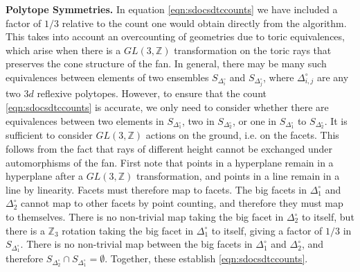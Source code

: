 \documentclass[aps,prl,twocolumn, superscriptaddress,groupedaddress,nofootinbib]{revtex4-1}
\newcommand{\bZ}{\mathbb{Z}}
\newcommand{\sdoc}{S_{\Delta_1^\circ}}
\newcommand{\sdtc}{S_{\Delta_2^\circ}}
\newcommand{\doc}{{\Delta_1^\circ}}
\newcommand{\dtc}{{\Delta_2^\circ}}
\begin{document}
\vspace{.2cm}
\noindent \textbf{Polytope Symmetries.}
In equation \eqref{eqn:sdocsdtccounts} 
we have included a factor of
$1/3$ relative to the count one would obtain directly from the algorithm.
This takes into account an overcounting of geometries due to toric equivalences,
which arise when there is a $GL(3,\bZ)$ transformation on the toric rays
that preserves the cone structure of the fan. In general, there may
be many such equivalences between elements of two ensembles $S_{\Delta_i^\circ}$
and $S_{\Delta_j^\circ}$, where $\Delta_{i,j}^\circ$ are any two $3d$ reflexive
polytopes. However, to ensure that the count  \eqref{eqn:sdocsdtccounts} is accurate,
we only need to consider whether there are equivalences between
two elements in $\sdoc$, two in $\sdtc$, or one in $\sdoc$ to $\sdtc$. It is sufficient to consider $GL(3,\bZ)$ actions
on the ground, i.e. on the facets. This follows from the fact that rays of different height cannot be exchanged under automorphisms of the fan. First note that points in a hyperplane remain in a
hyperplane after a $GL(3,\bZ)$ transformation, and points
in a line remain in a line by linearity. Facets must therefore map to
facets. The big facets in $\doc$ and $\dtc$ cannot map
to other facets by point counting, and therefore they
must map to themselves. There is no non-trivial map
taking the big facet in $\dtc$ to itself, but there is
a $\bZ_3$ rotation taking the big facet in $\doc$ to itself, giving a factor of $1/3$ in $\sdoc$. There is no non-trivial
map between the big facets in $\doc$ and $\dtc$, and therefore
$\sdtc\cap \sdoc  = \emptyset.$ Together, these establish
\eqref{eqn:sdocsdtccounts}.
\end{document}
